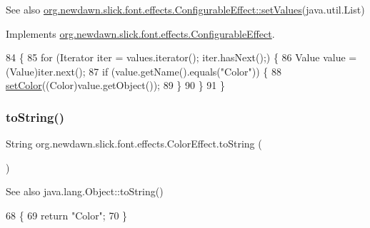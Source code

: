 \begin{DoxySeeAlso}{See also}
\mbox{\hyperlink{interfaceorg_1_1newdawn_1_1slick_1_1font_1_1effects_1_1_configurable_effect_ac5e1cb43cb0c6b61753616dc746903a2}{org.\+newdawn.\+slick.\+font.\+effects.\+Configurable\+Effect\+::set\+Values}}(java.\+util.\+List) 
\end{DoxySeeAlso}


Implements \mbox{\hyperlink{interfaceorg_1_1newdawn_1_1slick_1_1font_1_1effects_1_1_configurable_effect_ac5e1cb43cb0c6b61753616dc746903a2}{org.\+newdawn.\+slick.\+font.\+effects.\+Configurable\+Effect}}.


\begin{DoxyCode}
84                                        \{
85         \textcolor{keywordflow}{for} (Iterator iter = values.iterator(); iter.hasNext();) \{
86             Value value = (Value)iter.next();
87             \textcolor{keywordflow}{if} (value.getName().equals(\textcolor{stringliteral}{"Color"})) \{
88                 \mbox{\hyperlink{classorg_1_1newdawn_1_1slick_1_1font_1_1effects_1_1_color_effect_a2ffbac9b174a71718bf7fe933dd1fd52}{setColor}}((Color)value.getObject());
89             \}
90         \}
91     \}
\end{DoxyCode}
\mbox{\label{classorg_1_1newdawn_1_1slick_1_1font_1_1effects_1_1_color_effect_ad407a023e57bda66a9c20fdc66dd3224}} 
\subsubsection{\texorpdfstring{to\+String()}{toString()}}
{\footnotesize\ttfamily String org.\+newdawn.\+slick.\+font.\+effects.\+Color\+Effect.\+to\+String (\begin{DoxyParamCaption}{ }\end{DoxyParamCaption})\hspace{0.3cm}{\ttfamily [inline]}}

\begin{DoxySeeAlso}{See also}
java.\+lang.\+Object\+::to\+String() 
\end{DoxySeeAlso}

\begin{DoxyCode}
68                               \{
69         \textcolor{keywordflow}{return} \textcolor{stringliteral}{"Color"};
70     \}
\end{DoxyCode}


